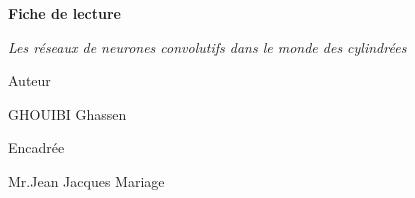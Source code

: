 \documentclass[french,a4paper,11pt,oneside]{article}
\begin{document}
	 \begin{titlepage}
		\centering 
		
		\vspace{1.5cm}
		
		{\huge\bfseries Fiche de lecture \par}
		\vspace{0.5cm}
		\vfill
		
		{\Large\itshape Les réseaux de neurones convolutifs dans le monde des cylindrées\par}
		\vfill
		

		{\large Auteur  \par
			GHOUIBI Ghassen \textsc{}\par}
		\vspace{1cm}
		{\large Encadrée \par
			Mr.Jean Jacques Mariage \textsc{}\par
		}
	\end{titlepage}

	\tableofcontents
	\newpage
\end{document}
